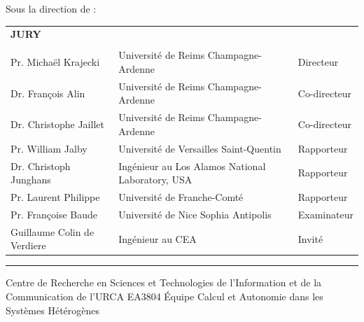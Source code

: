 \documentclass[11pt,a4paper]{book}
\begin{document}
{%
{
	Sous la direction de :\\ 
	\textbf{\phdDirector}
	\vspace{0.5cm}
	\vspace{\fill}
}

{
\normalsize
\begin{tabular}{l l l}
		\textbf{JURY} &  & \\
		&&\\
		Pr. Michaël Krajecki & Université de Reims Champagne-Ardenne & Directeur \\
		Dr. François Alin & Université de Reims Champagne-Ardenne & Co-directeur  \\
		Dr. Christophe Jaillet & Université de Reims Champagne-Ardenne & Co-directeur \\
		Pr. William Jalby & Université de Versailles Saint-Quentin & Rapporteur\\
		Dr. Christoph Junghans & Ingénieur au Los Alamos National Laboratory, USA & Rapporteur \\
		Pr. Laurent Philippe & Université de Franche-Comté & Rapporteur \\ 
		Pr. Françoise Baude & Université de Nice Sophia Antipolis& Examinateur\\
		Guillaume Colin de Verdiere & Ingénieur au CEA & Invit\'e
\end{tabular}
\vspace{0.5cm}
\hrule
\vspace{0.3cm}
}

{
	Centre de Recherche en Sciences et Technologies de l'Information et de la Communication de l'URCA EA3804
}
{
	\'Equipe Calcul et Autonomie dans les Systèmes Hétérogènes
}

}

\clearpage 
{}
\thispagestyle{empty}

\frontmatter



%


\tableofcontents

\mainmatter

\listoffigures
\end{document}
